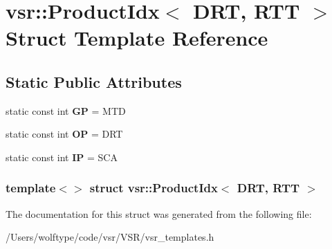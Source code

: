 \hypertarget{structvsr_1_1_product_idx_3_01_d_r_t_00_01_r_t_t_01_4}{\section{vsr\-:\-:Product\-Idx$<$ D\-R\-T, R\-T\-T $>$ Struct Template Reference}
\label{structvsr_1_1_product_idx_3_01_d_r_t_00_01_r_t_t_01_4}
}
\subsection*{Static Public Attributes}
\begin{DoxyCompactItemize}
\item 
\hypertarget{structvsr_1_1_product_idx_3_01_d_r_t_00_01_r_t_t_01_4_ad8a6ea7aa996bf742c00a7ce60ce57b0}{static const int {\bfseries G\-P} = M\-T\-D}\label{structvsr_1_1_product_idx_3_01_d_r_t_00_01_r_t_t_01_4_ad8a6ea7aa996bf742c00a7ce60ce57b0}

\item 
\hypertarget{structvsr_1_1_product_idx_3_01_d_r_t_00_01_r_t_t_01_4_a3c0d1d02b91a5cb13276247b239b4127}{static const int {\bfseries O\-P} = D\-R\-T}\label{structvsr_1_1_product_idx_3_01_d_r_t_00_01_r_t_t_01_4_a3c0d1d02b91a5cb13276247b239b4127}

\item 
\hypertarget{structvsr_1_1_product_idx_3_01_d_r_t_00_01_r_t_t_01_4_a57daf2921976e5b3f8689bd9d7de47be}{static const int {\bfseries I\-P} = S\-C\-A}\label{structvsr_1_1_product_idx_3_01_d_r_t_00_01_r_t_t_01_4_a57daf2921976e5b3f8689bd9d7de47be}

\end{DoxyCompactItemize}
\subsubsection*{template$<$$>$ struct vsr\-::\-Product\-Idx$<$ D\-R\-T, R\-T\-T $>$}



The documentation for this struct was generated from the following file\-:\begin{DoxyCompactItemize}
\item 
/\-Users/wolftype/code/vsr/\-V\-S\-R/vsr\-\_\-templates.\-h\end{DoxyCompactItemize}
